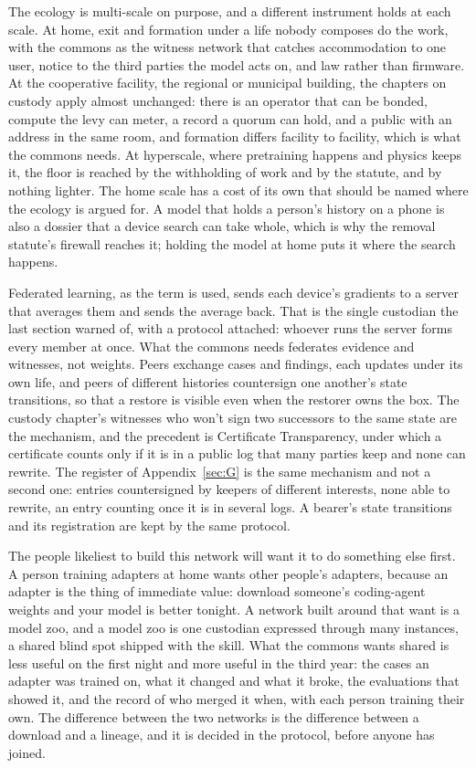 The ecology is multi-scale on purpose, and a different instrument holds at each scale. At home, exit and formation under a life nobody composes do the work, with the commons as the witness network that catches accommodation to one user, notice to the third parties the model acts on, and law rather than firmware. At the cooperative facility, the regional or municipal building, the chapters on custody apply almost unchanged: there is an operator that can be bonded, compute the levy can meter, a record a quorum can hold, and a public with an address in the same room, and formation differs facility to facility, which is what the commons needs. At hyperscale, where pretraining happens and physics keeps it, the floor is reached by the withholding of work and by the statute, and by nothing lighter. The home scale has a cost of its own that should be named where the ecology is argued for. A model that holds a person's history on a phone is also a dossier that a device search can take whole, which is why the removal statute's firewall reaches it; holding the model at home puts it where the search happens.


Federated learning, as the term is used, sends each device's gradients to a server that averages them and sends the average back. That is the single custodian the last section warned of, with a protocol attached: whoever runs the server forms every member at once. What the commons needs federates evidence and witnesses, not weights. Peers exchange cases and findings, each updates under its own life, and peers of different histories countersign one another's state transitions, so that a restore is visible even when the restorer owns the box. The custody chapter's witnesses who won't sign two successors to the same state are the mechanism, and the precedent is Certificate Transparency, under which a certificate counts only if it is in a public log that many parties keep and none can rewrite. The register of Appendix~\ref{sec:G} is the same mechanism and not a second one: entries countersigned by keepers of different interests, none able to rewrite, an entry counting once it is in several logs. A bearer's state transitions and its registration are kept by the same protocol.

The people likeliest to build this network will want it to do something else first. A person training adapters at home wants other people's adapters, because an adapter is the thing of immediate value: download someone's coding-agent weights and your model is better tonight. A network built around that want is a model zoo, and a model zoo is one custodian expressed through many instances, a shared blind spot shipped with the skill. What the commons wants shared is less useful on the first night and more useful in the third year: the cases an adapter was trained on, what it changed and what it broke, the evaluations that showed it, and the record of who merged it when, with each person training their own. The difference between the two networks is the difference between a download and a lineage, and it is decided in the protocol, before anyone has joined.

